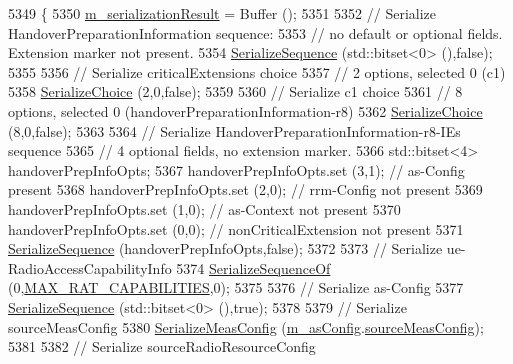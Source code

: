 \begin{DoxyCode}
5349 \{
5350   \hyperlink{classns3_1_1Asn1Header_a758b74023ea5bf40941af6f0a6a66058}{m\_serializationResult} = Buffer ();
5351 
5352   \textcolor{comment}{// Serialize HandoverPreparationInformation sequence:}
5353   \textcolor{comment}{// no default or optional fields. Extension marker not present.}
5354   \hyperlink{classns3_1_1Asn1Header_aa9744858380443ed95836fed08799aed}{SerializeSequence} (std::bitset<0> (),\textcolor{keyword}{false});
5355 
5356   \textcolor{comment}{// Serialize criticalExtensions choice}
5357   \textcolor{comment}{// 2 options, selected 0 (c1)}
5358   \hyperlink{classns3_1_1Asn1Header_a400ef4a710499da80fc55e23a973d4fa}{SerializeChoice} (2,0,\textcolor{keyword}{false});
5359 
5360   \textcolor{comment}{// Serialize c1 choice}
5361   \textcolor{comment}{// 8 options, selected 0 (handoverPreparationInformation-r8)}
5362   \hyperlink{classns3_1_1Asn1Header_a400ef4a710499da80fc55e23a973d4fa}{SerializeChoice} (8,0,\textcolor{keyword}{false});
5363 
5364   \textcolor{comment}{// Serialize HandoverPreparationInformation-r8-IEs sequence}
5365   \textcolor{comment}{// 4 optional fields, no extension marker.}
5366   std::bitset<4> handoverPrepInfoOpts;
5367   handoverPrepInfoOpts.set (3,1); \textcolor{comment}{// as-Config present}
5368   handoverPrepInfoOpts.set (2,0); \textcolor{comment}{// rrm-Config not present}
5369   handoverPrepInfoOpts.set (1,0); \textcolor{comment}{// as-Context not present}
5370   handoverPrepInfoOpts.set (0,0); \textcolor{comment}{// nonCriticalExtension not present}
5371   \hyperlink{classns3_1_1Asn1Header_aa9744858380443ed95836fed08799aed}{SerializeSequence} (handoverPrepInfoOpts,\textcolor{keyword}{false});
5372 
5373   \textcolor{comment}{// Serialize ue-RadioAccessCapabilityInfo}
5374   \hyperlink{classns3_1_1Asn1Header_a066b6dd077bde6b0c243f3eda2621277}{SerializeSequenceOf} (0,\hyperlink{lte-rrc-header_8cc_ac4d6753fe892830703ec19f19470b9a0}{MAX\_RAT\_CAPABILITIES},0);
5375 
5376   \textcolor{comment}{// Serialize as-Config}
5377   \hyperlink{classns3_1_1Asn1Header_aa9744858380443ed95836fed08799aed}{SerializeSequence} (std::bitset<0> (),\textcolor{keyword}{true});
5378 
5379   \textcolor{comment}{// Serialize sourceMeasConfig}
5380   \hyperlink{classns3_1_1RrcAsn1Header_a65f753653303d80ab92df652b8414350}{SerializeMeasConfig} (\hyperlink{classns3_1_1HandoverPreparationInfoHeader_adfafc689e36800c0c59d495f74e3bdc1}{m\_asConfig}.\hyperlink{structns3_1_1LteRrcSap_1_1AsConfig_a2ce82c6247fc2469637bd9b31104dcf5}{sourceMeasConfig});
5381 
5382   \textcolor{comment}{// Serialize sourceRadioResourceConfig}

\end{DoxyCode}
